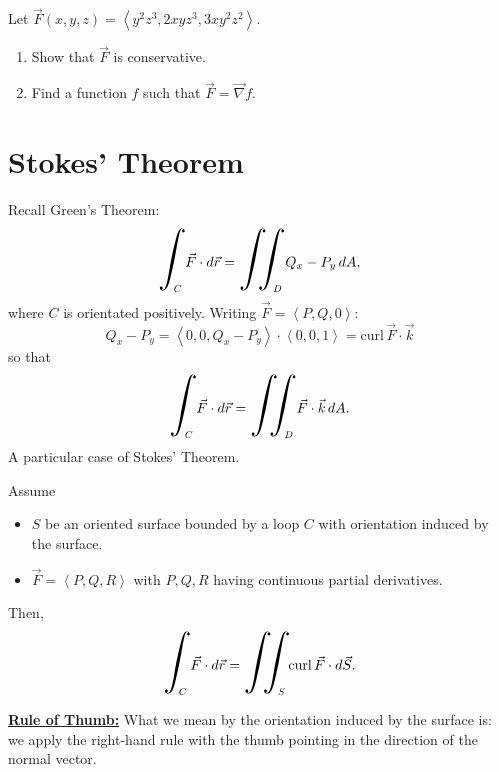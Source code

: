 \documentclass[20pt,a4paper]{extarticle}
\newcommand{\curl}{\mathrm{curl} \,}
\newcommand{\hint}[1]{\scalebox{2}{$\displaystyle\int_{\scalebox{0.35}{$#1$}}$}\,}
\newcommand{\hiint}[1]{\scalebox{2}{$\displaystyle\iint_{\scalebox{0.35}{$#1$}}$}\,}
\newcounter{example}[section]
\newcounter{theorem}
\begin{document}
\vspace*{0.5cm}

\begin{example}
Let $\vec{F} (x, y, z) = \left\langle y^2 z^3 , 2xyz^3 , 3xy^2 z^2 \right\rangle$.
	\begin{enumerate}[label=\textbf{\alph*)}]
		\item Show that $\vec{F}$ is conservative.
		\item Find a function $f$ such that $\vec{F} = \vec{\nabla} f$.
	\end{enumerate}
\end{example}

\begin{notes}

\end{notes}

\newpage 

\phantom{2} 

\newpage 

\section{Stokes' Theorem}

Recall Green's Theorem:
	\[
		\hint{C} \vec{F} \cdot d \vec{r} = \hiint{D} Q_x - P_y \, dA ,
	\]
where $C$ is orientated positively. Writing $\vec{F} = \left\langle P, Q, 0 \right\rangle$:
	$$
	Q_x - P_y = \left\langle 0 , 0 , Q_x - P_y \right\rangle \cdot \left\langle 0, 0, 1 \right\rangle = \curl \vec{F} \cdot \vec{k}
	$$
so that
	\[
		\hint{C} \vec{F} \cdot d \vec{r} = \hiint{D} \vec{F} \cdot \vec{k} \, dA .
	\]
A particular case of Stokes' Theorem.

\vspace*{0.3cm}

\begin{theorem}
Assume
	\begin{itemize}
	\item $S$ be an oriented surface bounded by a loop $C$ with orientation induced by the surface.
	\item $\vec{F} = \left\langle P , Q, R \right\rangle$ with $P, Q, R$ having continuous partial derivatives.
	\end{itemize}
Then,
	\[
		\hint{C} \vec{F} \cdot d\vec{r} = \hiint{S} \curl \vec{F} \cdot d \vec{S} .
	\]
\end{theorem}

\vspace*{0.3cm}

\underline{\textbf{Rule of Thumb:}} What we mean by the orientation induced by the surface is: we apply the right-hand rule with the thumb pointing in the direction of the normal vector.
\end{document}
